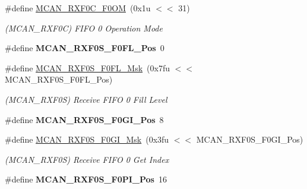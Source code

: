 \begin{DoxyCompactItemize}
\#define \mbox{\hyperlink{group__SAMV71__MCAN_ga9a057dce6dd1d895ca556ec2bead5062}{M\+C\+A\+N\+\_\+\+R\+X\+F0\+C\+\_\+\+F0\+OM}}~(0x1u $<$$<$ 31)
\begin{DoxyCompactList}\small\item\em (M\+C\+A\+N\+\_\+\+R\+X\+F0C) F\+I\+FO 0 Operation Mode \end{DoxyCompactList}\item 
\mbox{\label{group__SAMV71__MCAN_ga3bc43a8eb327cf684e033da8a2246de1}} 
\#define {\bfseries M\+C\+A\+N\+\_\+\+R\+X\+F0\+S\+\_\+\+F0\+F\+L\+\_\+\+Pos}~0
\item 
\mbox{\label{group__SAMV71__MCAN_ga25c5040c42190194438a0f5d5ea73611}} 
\#define \mbox{\hyperlink{group__SAMV71__MCAN_ga25c5040c42190194438a0f5d5ea73611}{M\+C\+A\+N\+\_\+\+R\+X\+F0\+S\+\_\+\+F0\+F\+L\+\_\+\+Msk}}~(0x7fu $<$$<$ M\+C\+A\+N\+\_\+\+R\+X\+F0\+S\+\_\+\+F0\+F\+L\+\_\+\+Pos)
\begin{DoxyCompactList}\small\item\em (M\+C\+A\+N\+\_\+\+R\+X\+F0S) Receive F\+I\+FO 0 Fill Level \end{DoxyCompactList}\item 
\mbox{\label{group__SAMV71__MCAN_ga559b3723ff2cb2779649e8756303ffaf}} 
\#define {\bfseries M\+C\+A\+N\+\_\+\+R\+X\+F0\+S\+\_\+\+F0\+G\+I\+\_\+\+Pos}~8
\item 
\mbox{\label{group__SAMV71__MCAN_gacaef75505974b530473c326dd8182a1d}} 
\#define \mbox{\hyperlink{group__SAMV71__MCAN_gacaef75505974b530473c326dd8182a1d}{M\+C\+A\+N\+\_\+\+R\+X\+F0\+S\+\_\+\+F0\+G\+I\+\_\+\+Msk}}~(0x3fu $<$$<$ M\+C\+A\+N\+\_\+\+R\+X\+F0\+S\+\_\+\+F0\+G\+I\+\_\+\+Pos)
\begin{DoxyCompactList}\small\item\em (M\+C\+A\+N\+\_\+\+R\+X\+F0S) Receive F\+I\+FO 0 Get Index \end{DoxyCompactList}\item 
\mbox{\label{group__SAMV71__MCAN_gacfc61c779bf46cae85307ab2bf7545db}} 
\#define {\bfseries M\+C\+A\+N\+\_\+\+R\+X\+F0\+S\+\_\+\+F0\+P\+I\+\_\+\+Pos}~16
\item 
\mbox{\label{group__SAMV71__MCAN_ga20b7a6d41c808b0fc76914f141064734}} 
$$
\end{DoxyCompactItemize}
